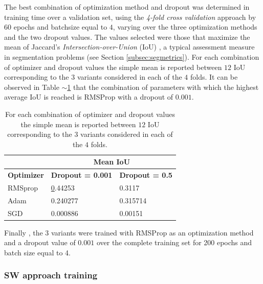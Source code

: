 \documentclass[a4paper,authoryear,review]{elsarticle}
\begin{document}
The best combination of optimization method and dropout was determined in training time over a validation set, using the \emph{4-fold cross validation} approach by 60 epochs and batchsize equal to $4$, varying over the three optimization methods and the two dropout values. The values selected were those that maximize the mean of Jaccard's \emph{Intersection-over-Union} (IoU) \citep{jaccard1912distribution}, a typical assessment measure in segmentation problems (see Section \ref{subsec:segmetrics}). For each combination of optimizer and dropout values the simple mean is reported between $12$ IoU corresponding to the $3$ variants considered in each of the $4$ folds. It can be observed in Table $\sim$\ref{tab:TablaX} that the combination of parameters with which the highest average IoU is reached is RMSProp with a dropout of $0.001$. 

\begin{table}[]
    \centering
        \begin{tabular}{lll}
            \hline
            \multicolumn{1}{|l|}{} & \multicolumn{2}{c|}{\textbf{Mean IoU}} \\ \hline
            \multicolumn{1}{|c|}{\textbf{Optimizer}} & \multicolumn{1}{c|}{\textbf{Dropout = 0.001}} & \multicolumn{1}{c|}{\textbf{Dropout = 0.5}} \\ \hline
            RMSprop & {\ul 0.44253} & 0.3117 \\
            Adam & 0.240277 & 0.315714 \\
            SGD & 0.000886 & 0.00151 \\ \hline
    \end{tabular}%
    \caption{
For each combination of optimizer and dropout values the simple mean is reported between $12$ IoU corresponding to the $3$ variants considered in each of the $4$ folds.
}
    \label{tab:TablaX}
\end{table}

Finally , the 3 variants were trained with RMSProp as an optimization method and a dropout value of $0.001$ over the complete training set for 200 epochs and batch size equal to 4.

\subsubsection{SW approach training}
\label{sec:swtrain}
\end{document}
